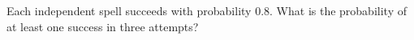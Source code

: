 Each independent spell succeeds with probability 0.8. What is the probability of at least one success in three attempts?
